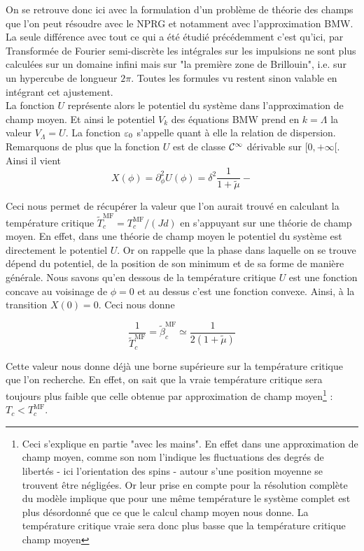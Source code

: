 \documentclass[10pt]{article}
\begin{document}
\begin{multicols}{2}
On se retrouve donc ici avec la formulation d'un problème de théorie des champs que l'on peut résoudre avec le NPRG et notamment avec l'approximation BMW. La seule différence avec tout ce qui a été étudié précédemment c'est qu'ici, par Transformée de Fourier semi-discrète les intégrales sur les impulsions ne sont plus calculées sur un domaine infini mais sur "la première zone de Brillouin", i.e. sur un hypercube de longueur $2\pi$. Toutes les formules vu restent sinon valable en intégrant cet ajustement.\\

 La fonction $U$ représente alors le potentiel du système dans l'approximation de champ moyen. Et ainsi le potentiel $V_k$ des équations BMW prend en $k=\Lambda$ la valeur $V_\Lambda = U$. La fonction $\varepsilon_0$ s'appelle quant à elle la relation de dispersion.\\
 
 
Remarquons de plus que la fonction $U$ est de classe $\mathcal{C}^\infty$ dérivable sur $[0,+\infty[$. Ainsi il vient 
\begin{equation}
X(\phi) = \partial_\phi^2 U(\phi) = \delta^2 \frac{1}{1+\tilde{\mu}} - 
\end{equation}

Ceci nous permet de récupérer la valeur que l'on aurait trouvé en calculant la température critique $\tilde{T}_c^{\text{MF}} = T_c^{\text{MF}}/(Jd) $ en s'appuyant sur une théorie de champ moyen. En effet, dans une théorie de champ moyen le potentiel du système est directement le potentiel $U$. Or on rappelle que la phase dans laquelle on se trouve dépend du potentiel, de la position de son minimum et de sa forme de manière générale. Nous savons qu'en dessous de la température critique $U$ est une fonction concave au voisinage de $\phi = 0$ et au dessus c'est une fonction convexe. Ainsi, à la transition $X(0) = 0$. Ceci nous donne

\begin{equation}
 \frac{1}{\tilde{T}_c^{\text{MF}}} = \tilde{\beta}_c^{\text{MF}} \simeq \frac{1}{2(1+\tilde{\mu})}
\end{equation}

Cette valeur nous donne déjà une borne supérieure sur la température critique que l'on recherche. En effet, on sait que la vraie température critique sera toujours plus faible que celle obtenue par approximation de champ moyen\footnote{Ceci s'explique en partie "avec les mains". En effet dans une approximation de champ moyen, comme son nom l'indique les fluctuations des degrés de libertés - ici l'orientation des spins - autour s'une position moyenne se trouvent être négligées. Or leur prise en compte pour la résolution complète du modèle implique que pour une même température le système complet est plus désordonné que ce que le calcul champ moyen nous donne. La température critique vraie sera donc plus basse que la température critique champ moyen} : $T_c < T_c^{\text{MF}}$.



\end{multicols}
\end{document}

